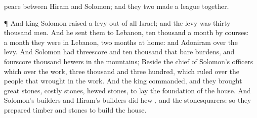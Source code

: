 {peace between
Hiram and
Solomon; and they
two
made a
league
together.
\par }{\PP {}¶ And
king
Solomon
raised a
levy out of all
Israel; and the
levy was
thirty
thousand
men.
And he
sent them to
Lebanon,
ten
thousand a
month by
courses: a
month they were in
Lebanon,
{}
two
months at
home: and
Adoniram
{} over the
levy.
And
Solomon had threescore and
ten
thousand that
bare
burdens, and
fourscore
thousand
hewers in the
mountains;
Beside the
chief of
Solomon’s
officers which
{} over the
work,
three
thousand and
three
hundred, which
ruled over the
people that
wrought in the
work.
And the
king
commanded, and they
brought
great
stones,
costly
stones,
{}
hewed
stones, to lay the
foundation of the
house.
And
Solomon’s
builders and
Hiram’s
builders did
hew
{}, and the
stonesquarers: so they
prepared
timber and
stones to
build the
house.

}
